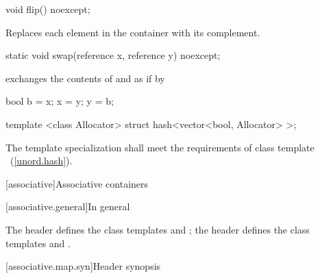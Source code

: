 %
%
\begin{itemdecl}
void flip() noexcept;
\end{itemdecl}

\begin{itemdescr}
\pnum
\effects Replaces each element in the container with its complement.
\end{itemdescr}

%
%
\begin{itemdecl}
static void swap(reference x, reference y) noexcept;
\end{itemdecl}

\begin{itemdescr}
\pnum
\effects exchanges the contents of  and  as if by

\begin{codeblock}
bool b = x;
x = y;
y = b;
\end{codeblock}

\end{itemdescr}

\begin{itemdecl}
template <class Allocator> struct hash<vector<bool, Allocator> >;
\end{itemdecl}

\begin{itemdescr}
\pnum
The template specialization shall meet the requirements of class template
~(\ref{unord.hash}).
\end{itemdescr}

[associative]{Associative containers}

[associative.general]{In general}

\pnum
The header  defines the class templates  and
; the header  defines the class templates
 and .

[associative.map.syn]{Header  synopsis}

